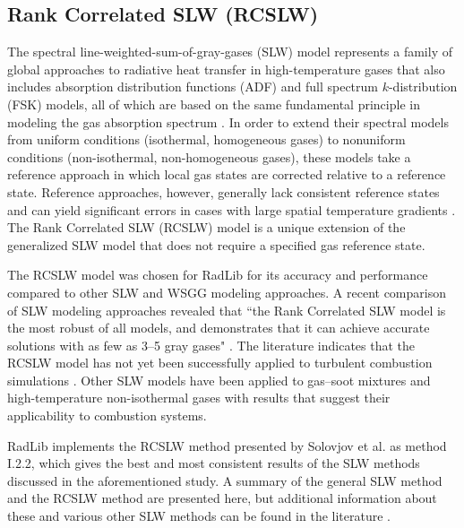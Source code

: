 \documentclass[preprint,12pt]{elsarticle}
\begin{document}

\subsection{Rank Correlated SLW (RCSLW)} \label{s:RCSLW}

The spectral line-weighted-sum-of-gray-gases (SLW) model represents a family of global approaches to radiative heat transfer in high-temperature gases that also includes absorption distribution functions (ADF) and full spectrum $k$-distribution (FSK) models, all of which are based on the same fundamental principle in modeling the gas absorption spectrum \cite{Solovjov_2016}. In order to extend their spectral models from uniform conditions (isothermal, homogeneous gases) to nonuniform conditions (non-isothermal, non-homogeneous gases), these models take a reference approach in which local gas states are corrected relative to a reference state. Reference approaches, however, generally lack consistent reference states and can yield significant errors in cases with large spatial temperature gradients \cite{Solovjov_2017}. The Rank Correlated SLW (RCSLW) model is a unique extension of the generalized SLW model that does not require a specified gas reference state.

The RCSLW model was chosen for RadLib for its accuracy and performance compared to other SLW and WSGG modeling approaches. A recent comparison of SLW modeling approaches revealed that ``the Rank Correlated SLW model is the most robust of all models, and demonstrates that it can achieve accurate solutions with as few as 3–5 gray gases" \citep{Badger_2019}. The literature indicates that the RCSLW model has not yet been successfully applied to turbulent combustion simulations \cite{Modest_2016,Coelho_2017}. 
Other SLW models have been applied to gas--soot mixtures \cite{Solovjov_2001,Solovjov_2001b} and high-temperature non-isothermal gases \cite{Solovjov_2011,Solovjov_2020} with results that suggest their applicability to combustion systems. 

RadLib implements the RCSLW method presented by Solovjov et al. \cite{Solovjov_2017} as method I.2.2, which gives the best and most consistent results of the SLW methods discussed in the aforementioned study. A summary of the general SLW method and the RCSLW method are presented here, but additional information about these and various other SLW methods can be found in the literature \cite{Solovjov_2000, Solovjov_2001, Solovjov_2008, Solovjov_2011, Solovjov_2014, Solovjov_2016, Solovjov_2017, Webb_2018}. 
\end{document}
